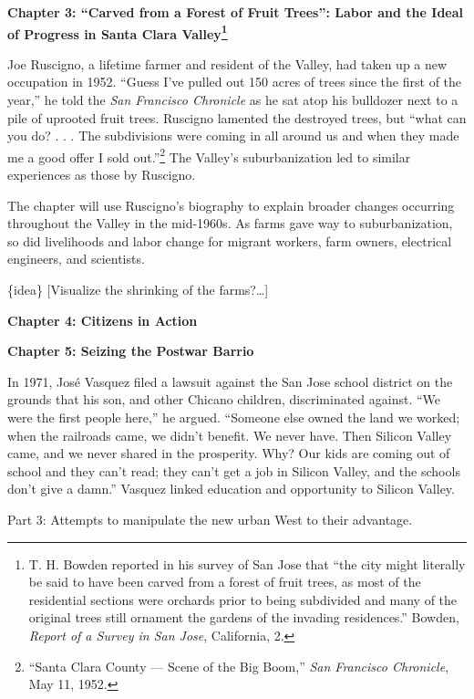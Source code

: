 \documentclass[11pt,article,oneside]{memoir}
\begin{document}
\textbf{Chapter 3: ``Carved from a Forest of Fruit Trees'': Labor and
the Ideal of Progress in Santa Clara Valley\footnote{T. H. Bowden
  reported in his survey of San Jose that ``the city might literally be
  said to have been carved from a forest of fruit trees, as most of the
  residential sections were orchards prior to being subdivided and many
  of the original trees still ornament the gardens of the invading
  residences.'' Bowden, \emph{Report of a Survey in San Jose},
  California, 2.}}

Joe Ruscigno, a lifetime farmer and resident of the Valley, had taken up
a new occupation in 1952. ``Guess I've pulled out 150 acres of trees
since the first of the year,'' he told the \emph{San Francisco
Chronicle} as he sat atop his bulldozer next to a pile of uprooted fruit
trees. Ruscigno lamented the destroyed trees, but ``what can you do? . .
. The subdivisions were coming in all around us and when they made me a
good offer I sold out.''\footnote{``Santa Clara County --- Scene of the
  Big Boom,'' \emph{San Francisco Chronicle}, May 11, 1952.} The
Valley's suburbanization led to similar experiences as those by
Ruscigno.

The chapter will use Ruscigno's biography to explain broader changes
occurring throughout the Valley in the mid-1960s. As farms gave way to
suburbanization, so did livelihoods and labor change for migrant
workers, farm owners, electrical engineers, and scientists.

\{idea\} {[}Visualize the shrinking of the farms?\ldots{}{]}

\textbf{Chapter 4: Citizens in Action}

\textbf{Chapter 5: Seizing the Postwar Barrio}

In 1971, José Vasquez filed a lawsuit against the San Jose school
district on the grounds that his son, and other Chicano children,
discriminated against. ``We were the first people here,'' he argued.
``Someone else owned the land we worked; when the railroads came, we
didn't benefit. We never have. Then Silicon Valley came, and we never
shared in the prosperity. Why? Our kids are coming out of school and
they can't read; they can't get a job in Silicon Valley, and the schools
don't give a damn.'' Vasquez linked education and opportunity to Silicon
Valley.

Part 3: Attempts to manipulate the new urban West to their advantage.
\end{document}
